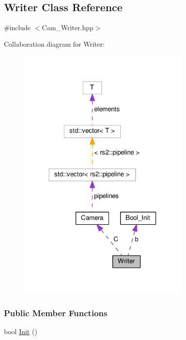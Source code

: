 \hypertarget{classWriter}{}\subsection{Writer Class Reference}
\label{classWriter}


{\ttfamily \#include $<$Cam\+\_\+\+Writer.\+hpp$>$}



Collaboration diagram for Writer\+:\nopagebreak
\begin{figure}[H]
\begin{center}
\leavevmode
\includegraphics[width=246pt]{classWriter__coll__graph}
\end{center}
\end{figure}
\subsubsection*{Public Member Functions}
\begin{DoxyCompactItemize}
\item 
bool \hyperlink{classWriter_a4193b0f06fb33e260e5eb26ea9356a1c}{Init} ()
\end{DoxyCompactItemize}

